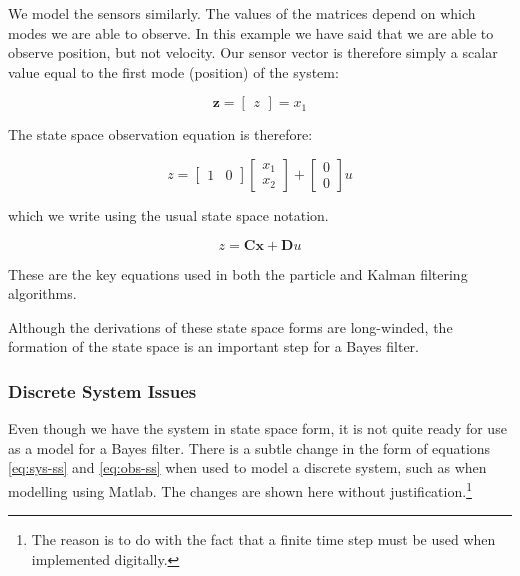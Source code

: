 We model the sensors similarly. The values of the matrices depend on which modes
we are able to observe. In this example we have said that we are able to observe
position, but not velocity. Our sensor vector is therefore simply a scalar
value equal to
the first mode (position) of the system:

\begin{equation}
    \mathbf{z} =
    \begin{bmatrix}
        z
    \end{bmatrix}
    = x_{1}
\end{equation}

The state space observation equation is therefore:

\begin{equation}
    z =
    \begin{bmatrix}
        1 & 0
    \end{bmatrix}
    \begin{bmatrix}
        x_{1} \\
        x_{2}
    \end{bmatrix}
    +
    \begin{bmatrix}
        0 \\
        0
    \end{bmatrix}
    u
\end{equation}

which we write using the usual state space notation.

\begin{equation}\label{eq:obs-ss}
z = \mathbf{C}\mathbf{x} + \mathbf{D}u
\end{equation}

These are the key equations used in both the particle and Kalman filtering
algorithms.

Although the derivations of these state space forms are long-winded, the
formation of the state space is an important step for a Bayes filter.

\subsubsection{Discrete System Issues}\label{sec:discrete}
Even though we have the system in state space form, it is not quite ready for
use as a model for a Bayes filter. There is a subtle change in the form of equations
\ref{eq:sys-ss} and \ref{eq:obs-ss} when used to model a discrete system,
such as when modelling using Matlab. The
changes are shown here without justification.\footnote{The reason is to do with
    the fact that a finite time step must be used when implemented digitally.
}


